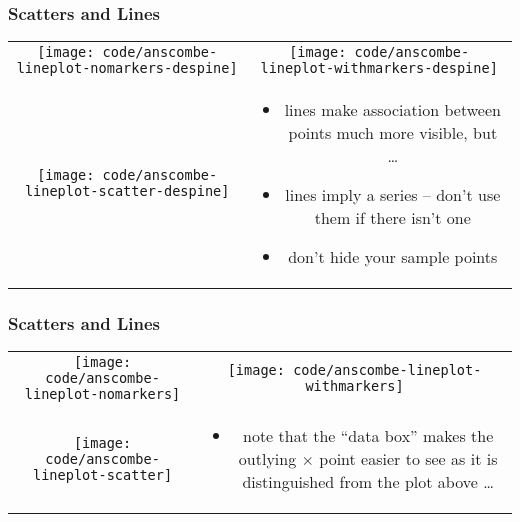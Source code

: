 \documentclass{beamer}
\begin{document}
\begin{frame}
\frametitle{Scatters and Lines}
\begin{tabular}{@{}cc}
\begin{minipage}{0.5\textwidth}
\texttt{[image: code/anscombe-lineplot-nomarkers-despine]}
\end{minipage}&
\begin{minipage}{0.5\textwidth}
\texttt{[image: code/anscombe-lineplot-withmarkers-despine]}
\end{minipage}\\
\begin{minipage}{0.5\textwidth}
\texttt{[image: code/anscombe-lineplot-scatter-despine]}
\end{minipage}&
\begin{minipage}{0.5\textwidth}
\begin{itemize}
\item lines make association between points much more visible, {\large but \dots}
\item lines imply a series -- don't use them if there isn't one
\item don't hide your sample points
\end{itemize}
\end{minipage}\\
\end{tabular}
\end{frame}

\begin{frame}
\frametitle{Scatters and Lines}
\begin{tabular}{@{}cc}
\begin{minipage}{0.5\textwidth}
{\texttt{[image: code/anscombe-lineplot-nomarkers]}}
\end{minipage}&
\begin{minipage}{0.5\textwidth}
\texttt{[image: code/anscombe-lineplot-withmarkers]}
\end{minipage}\\
\begin{minipage}{0.5\textwidth}
\texttt{[image: code/anscombe-lineplot-scatter]}
\end{minipage}&
\begin{minipage}{0.5\textwidth}
\begin{itemize}
\item note that the ``data box'' makes the outlying $\times$ point easier to see as it is distinguished from the plot above \dots
\end{itemize}
\end{minipage}\\
\end{tabular}
\end{frame}
\end{document}

